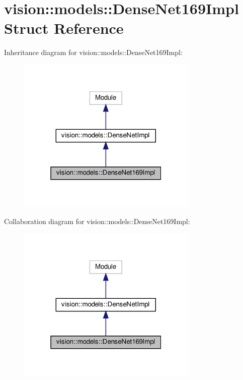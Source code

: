 \hypertarget{structvision_1_1models_1_1DenseNet169Impl}{}\section{vision\+:\+:models\+:\+:Dense\+Net169\+Impl Struct Reference}
\label{structvision_1_1models_1_1DenseNet169Impl}


Inheritance diagram for vision\+:\+:models\+:\+:Dense\+Net169\+Impl\+:
\nopagebreak
\begin{figure}[H]
\begin{center}
\leavevmode
\includegraphics[width=244pt]{structvision_1_1models_1_1DenseNet169Impl__inherit__graph}
\end{center}
\end{figure}


Collaboration diagram for vision\+:\+:models\+:\+:Dense\+Net169\+Impl\+:
\nopagebreak
\begin{figure}[H]
\begin{center}
\leavevmode
\includegraphics[width=244pt]{structvision_1_1models_1_1DenseNet169Impl__coll__graph}
\end{center}
\end{figure}
